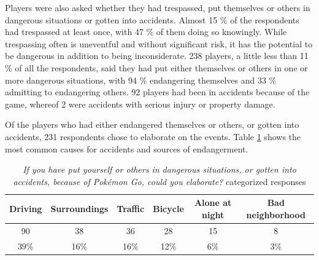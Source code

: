Players were also asked whether they had trespassed, put themselves or others in dangerous situations or gotten into accidents. Almost 15 \% of the respondents had trespassed at least once, with 47 \% of them doing so knowingly. While trespassing often is uneventful and without significant risk, it has the potential to be dangerous in addition to being inconsiderate. 238 players, a little less than 11 \% of all the respondents, said they had put either themselves or others in one or more dangerous situations, with 94 \% endangering themselves and 33 \% admitting to endangering others. 92 players had been in accidents because of the game, whereof 2 were accidents with serious injury or property damage.

Of the players who had either endangered themselves or others, or gotten into accidents, 231 respondents chose to elaborate on the events. Table \ref{tbl:danger-or-accidents-elaboration} shows the most common causes for accidents and sources of endangerment.

\begin{table}[h]
	\centering
	\caption{\emph{If you have put yourself or others in dangerous situations, or gotten into accidents, because of Pokémon Go, could you elaborate?} categorized responses}
	\label{tbl:danger-or-accidents-elaboration}
	\begin{tabular}{|c|c|c|c|c|c|}
		\hline
		Driving	& Surroundings	& Traffic	& Bicycle	& Alone at night	& Bad neighborhood\\
		\hline\hline
		90		& 38			& 36		& 28		& 15				& 8\\
		39\%	& 16\%			& 16\%		& 12\%		& 6\%				& 3\%\\\hline
	\end{tabular}
\end{table}

